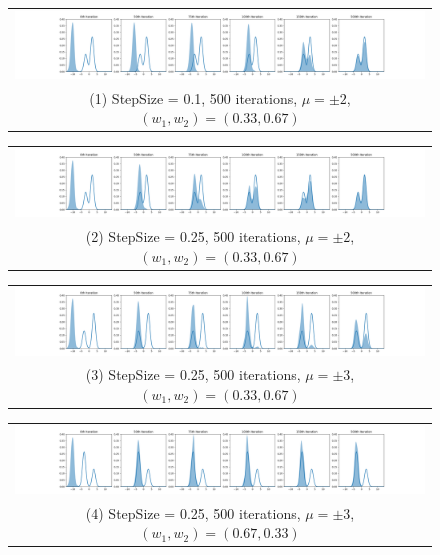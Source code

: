 
\begin{figure}[!htbp]
    \centering
    \begin{tabular}{@{}c@{}}
        \includegraphics[width=\textwidth]{figs/toy-figure1_step0.1_mu2.0_w0.33_gaussian.png} \\
        \small (1) StepSize = 0.1, 500 iterations, $\mu = \pm 2$, $(w_1, w_2) = (0.33, 0.67)$
    \end{tabular}
    
    \begin{tabular}{@{}c@{}}
        \includegraphics[width=\textwidth]{figs/toy-figure1.png} \\
        \small (2) StepSize = 0.25, 500 iterations, $\mu = \pm 2$, $(w_1, w_2) = (0.33, 0.67)$
    \end{tabular}
    
    \begin{tabular}{@{}c@{}}
        \includegraphics[width=\textwidth]{figs/toy-figure1_step0.25_mu3.0_w0.33_gaussian.png} \\
        \small (3) StepSize = 0.25, 500 iterations, $\mu = \pm 3$, $(w_1, w_2) = (0.33, 0.67)$
    \end{tabular}
    
    \begin{tabular}{@{}c@{}}
        \includegraphics[width=\textwidth]{figs/toy-figure1_step0.25_mu3.0_w0.67_gaussian.png} \\
        \small (4) StepSize = 0.25, 500 iterations, $\mu = \pm 3$, $(w_1, w_2) = (0.67, 0.33)$
    \end{tabular}
    

\end{figure}
